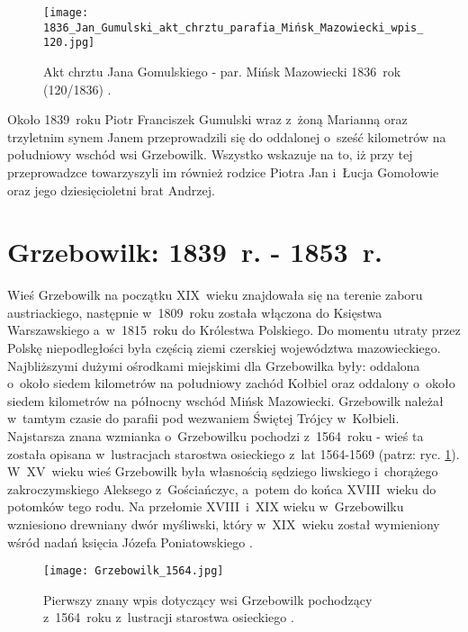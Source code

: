 \begin{figure}[!ht]
    \vspace*{0.5cm}
    \centering \texttt{[image: 
        1836\_Jan\_Gumulski\_akt\_chrztu\_parafia\_Mińsk\_Mazowiecki\_wpis\_120.jpg]}
    \captionsetup{format=hang}
    \caption{Akt chrztu Jana Gomulskiego - par. Mińsk Mazowiecki 1836~rok 
    (120/1836) \cite{par_minsk2}.}
    \label{fig:jgomulski_1836}
\end{figure}

Około 1839~roku Piotr Franciszek Gumulski wraz z~żoną Marianną oraz 
trzyletnim synem Janem przeprowadzili się do oddalonej o~sześć kilometrów na 
południowy wschód wsi Grzebowilk. Wszystko wskazuje na to, iż przy tej 
przeprowadzce towarzyszyli im również rodzice Piotra Jan i~Łucja Gomołowie 
oraz jego dziesięcioletni brat Andrzej.

\newpage
\ifodd\value{page}\hbox{}\newpage\fi



\section{Grzebowilk: 1839~r. - 1853~r.}

Wieś Grzebowilk na początku XIX~wieku znajdowała się na terenie zaboru 
austriackiego, następnie w~1809~roku została włączona do Księstwa 
Warszawskiego a~w~1815~roku do Królestwa Polskiego. Do momentu utraty przez 
Polskę niepodległości była częścią ziemi czerskiej województwa mazowieckiego. 
Najbliższymi dużymi ośrodkami miejskimi dla Grzebowilka były: oddalona 
o~około siedem kilometrów na południowy zachód Kołbiel oraz oddalony o~około 
siedem kilometrów na północny wschód Mińsk Mazowiecki. Grzebowilk należał 
w~tamtym czasie do parafii pod wezwaniem Świętej Trójcy w~Kołbieli. 
Najstarsza znana wzmianka o~Grzebowilku pochodzi z~1564~roku - wieś ta 
została opisana w~lustracjach starostwa osieckiego z~lat 1564-1569 
\cite{agad2} (patrz: ryc. \ref{fig:jgomulski_1836}). W~XV~wieku wieś 
Grzebowilk była własnością sędziego liwskiego i~chorążego zakroczymskiego 
Aleksego z~Gościańczyc, a~potem do końca XVIII~wieku do potomków tego rodu. 
Na przełomie XVIII~i~XIX wieku w~Grzebowilku wzniesiono drewniany dwór 
myśliwski, który w~XIX~wieku został wymieniony wśród nadań księcia Józefa 
Poniatowskiego \cite{klos}.

\begin{figure}[!ht]
    \vspace*{0.5cm}
    \centering \texttt{[image: 
        Grzebowilk\_1564.jpg]}
    \captionsetup{format=hang}
    \caption{Pierwszy znany wpis dotyczący wsi Grzebowilk pochodzący 
    z~1564~roku z~lustracji starostwa osieckiego \cite{agad2}.}
    \label{fig:grzebowilk_1564}
\end{figure}

